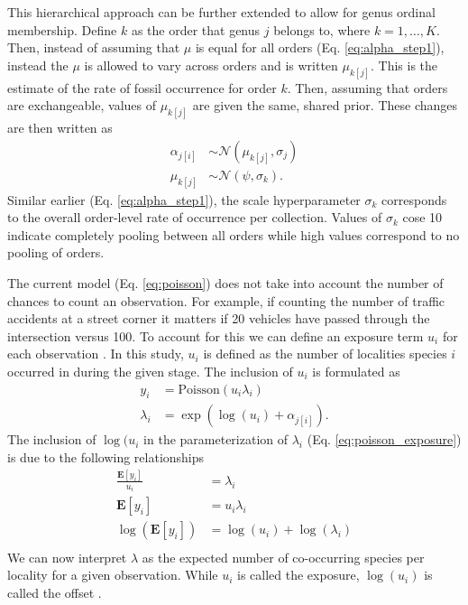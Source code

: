 \documentclass[12pt,letterpaper]{article}
\begin{document}
This hierarchical approach can be further extended to allow for genus ordinal membership. Define \(k\) as the order that genus \(j\) belongs to, where \(k = 1, \dots, K\). Then, instead of assuming that \(\mu\) is equal for all orders (Eq. \ref{eq:alpha_step1}), instead the \(\mu\) is allowed to vary across orders and is written \(\mu_{k[j]}\). This is the estimate of the rate of fossil occurrence for order \(k\). Then, assuming that orders are exchangeable, values of \(\mu_{k[j]}\) are given the same, shared prior. These changes are then written as
\begin{align}
  \alpha_{j[i]} &\sim \mathcal{N}(\mu_{k[j]}, \sigma_{j}) \nonumber \\
  \mu_{k[j]} &\sim \mathcal{N}(\psi, \sigma_{k}).
  \label{eq:alpha_step2}
\end{align}
Similar earlier (Eq. \ref{eq:alpha_step1}), the scale hyperparameter \(\sigma_{k}\) corresponds to the overall order-level rate of occurrence per collection. Values of \(\sigma_{k}\) cose 10 indicate completely pooling between all orders while high values correspond to no pooling of orders.

The current model (Eq. \ref{eq:poisson}) does not take into account the number of chances to count an observation. For example, if counting the number of traffic accidents at a street corner it matters if 20 vehicles have passed through the intersection versus 100. To account for this we can define an exposure term \(u_{i}\) for each observation \citep{Gelman2007}. In this study, \(u_{i}\) is defined as the number of localities species \(i\) occurred in during the given stage. The inclusion of \(u_{i}\) is formulated as 
\begin{align}
  y_{i} &= \mathrm{Poisson}(u_{i}\lambda_{i}) \nonumber\\
  \lambda_{i} &= \exp(\log(u_{i}) + \alpha_{j[i]}).
  \label{eq:poisson_exposure}
\end{align}
The inclusion of \(\log(u_{i}\) in the parameterization of \(\lambda_{i}\) (Eq. \ref{eq:poisson_exposure}) is due to the following relationships 
\begin{align*}
  \frac{\mathbf{E}[y_i]}{u_{i}} &= \lambda_{i} \\
  \mathbf{E}[y_{i}] &= u_{i}\lambda_{i} \\
  \log(\mathbf{E}[y_{i}]) &= \log(u_{i}) + \log(\lambda_{i}) \\
\end{align*}
We can now interpret \(\lambda\) as the expected number of co-occurring species per locality for a given observation. While \(u_{i}\) is called the exposure, \(\log(u_{i})\) is called the offset \citep{Gelman2007}. 
\end{document}
